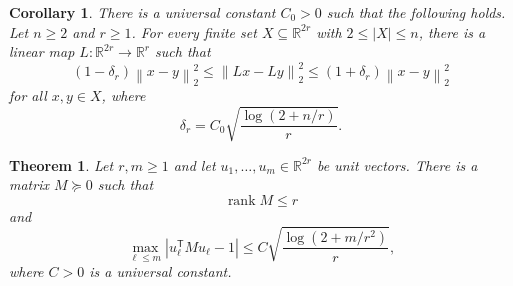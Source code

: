 \documentclass[10pt,a4paper]{amsart}
\newtheorem{theorem}{Theorem}
\newtheorem{corollary}{Corollary}
\newcommand{\R}{\mathbb R}
\newcommand{\abs}[1]{\left\lvert #1\right\rvert}
\newcommand{\norm}[1]{\left\lVert #1\right\rVert_2}
\newcommand{\rank}{\operatorname{rank}}
\begin{document}
\begin{corollary}\label{cor:one-step}
There is a universal constant $C_0>0$ such that the following holds.
Let $n\geq2$ and $r\geq1$. For every finite set
$X\subseteq\R^{2r}$ with $2\leq\abs{X}\leq n$, there is a linear map
$L:\R^{2r}\to\R^r$ such that
\[
 (1-\delta_r)\norm{x-y}^2
 \leq
 \norm{Lx-Ly}^2
 \leq
 (1+\delta_r)\norm{x-y}^2
\]
for all $x,y\in X$, where
\[
 \delta_r
 =
 C_0\sqrt{\frac{\log(2+n/r)}{r}}.
\]
\end{corollary}

\begin{theorem}
\label{thm:psd}
Let $r,m\geq1$ and let $u_1,\ldots,u_m\in\R^{2r}$ be unit vectors. There is
a matrix $M\succeq0$ such that
\[
 \rank M\leq r
\]
and
\[
 \max_{\ell\leq m}
 \abs{u_\ell^{\mathsf T}Mu_\ell-1}
 \leq
 C\sqrt{\frac{\log(2+m/r^2)}{r}},
\]
where $C>0$ is a universal constant.
\end{theorem}
\end{document}
